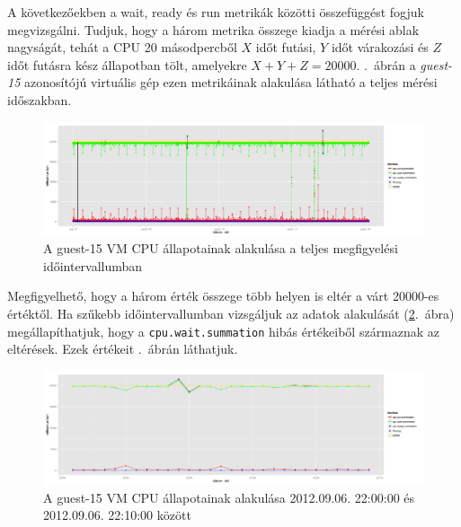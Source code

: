 \documentclass[a4paper,10pt,titlepage]{article}
\begin{document}
A következőekben a wait, ready és run metrikák közötti összefüggést fogjuk megvizsgálni. Tudjuk, hogy a három metrika összege kiadja a mérési ablak nagyságát, tehát a CPU 20 másodpercből $X$ időt futási, $Y$ időt várakozási és $Z$ időt futásra kész állapotban tölt, amelyekre $X+Y+Z=20000$. .~ábrán a \textit{guest-15} azonosítójú virtuális gép ezen metrikáinak alakulása látható a teljes mérési időszakban.

\begin{figure}[h!]
\centering
\includegraphics[width=1.00\textwidth]{figures/cpu_run_wait_ready-guest-15-20120826230140-20120924083120.png}
\caption{ A guest-15 VM CPU állapotainak alakulása a teljes megfigyelési időintervallumban \label{fig:cpu_run_wait_ready-guest-15-01}}
\end{figure}

Megfigyelhető, hogy a három érték összege több helyen is eltér a várt 20000-es értéktől. Ha szűkebb időintervallumban vizsgáljuk az adatok alakulását (\ref{fig:cpu_run_wait_ready-guest-15-02}.~ábra) megállapíthatjuk, hogy a \texttt{cpu.wait.summation} hibás értékeiből származnak az eltérések. Ezek értékeit .~ábrán láthatjuk. 


\begin{figure}[h!]
\centering
\includegraphics[width=1.00\textwidth]{figures/cpu_run_wait_ready-guest-15-20120906220000-20120906221000.png}
\caption{ A guest-15 VM CPU állapotainak alakulása 2012.09.06. 22:00:00 és 2012.09.06. 22:10:00 között \label{fig:cpu_run_wait_ready-guest-15-02}}
\end{figure}
\end{document}
